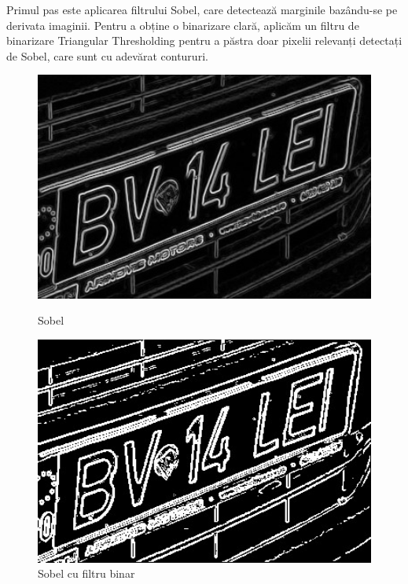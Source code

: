 \documentclass[a4paper,12pt]{report}
\begin{document}
Primul pas este aplicarea filtrului Sobel, care detectează marginile bazându-se pe derivata imaginii. Pentru a obține o binarizare clară, aplicăm un filtru de binarizare Triangular Thresholding pentru a păstra doar pixelii relevanți detectați de Sobel, care sunt cu adevărat contururi.

\begin{figure}[h]
    \centering
    \begin{minipage}{0.4\textwidth}
        \centering
        \includegraphics[width=1\textwidth]{images/sobel.jpg}
        \caption{Sobel}
    \end{minipage}
    \hspace{0.05\textwidth}
    \begin{minipage}{0.4\textwidth}
        \centering
        \includegraphics[width=1\textwidth]{images/binary_sobel.jpg}
        \caption{Sobel cu filtru binar}
    \end{minipage}
\end{figure}
\FloatBarrier
\end{document}

